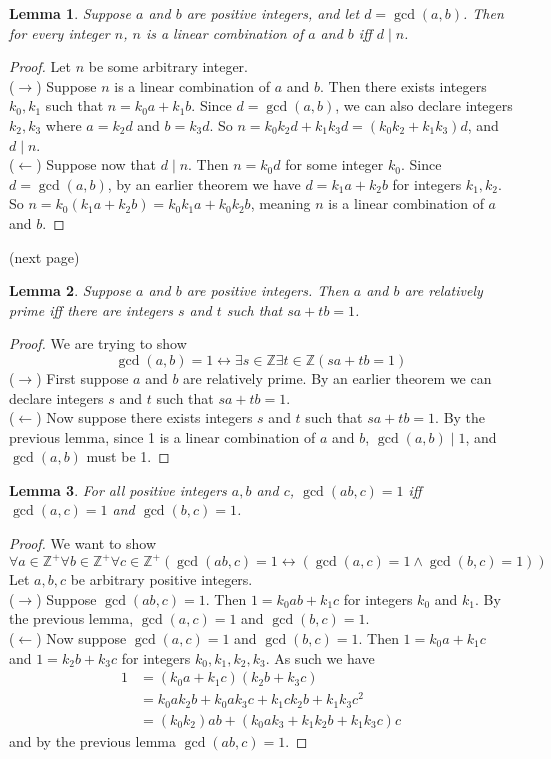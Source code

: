 \documentclass{report}
\newtheorem*{lemma}{Lemma}
\theoremstyle{definition}
\begin{document}
\begin{lemma}
Suppose $a$ and $b$ are positive integers, and let $d=\gcd(a,b)$. Then for every integer $n$, $n$ is a linear combination of $a$ and $b$ iff 
$d\mid n$. 
\end{lemma}
\begin{proof}
Let $n$ be some arbitrary integer.\\
\indent($\rightarrow$) Suppose $n$ is a linear combination of $a$ and $b$. Then there exists integers $k_0,k_1$ such that $n=k_0a+k_1b$. Since
$d=\gcd(a,b)$, we can also declare integers $k_2,k_3$ where $a=k_2d$ and $b=k_3d$. So $n=k_0k_2d+k_1k_3d=(k_0k_2+k_1k_3)d$, and $d\mid n$.\\
\indent ($\leftarrow$) Suppose now that $d\mid n$. Then $n=k_0d$ for some integer $k_0$. Since $d=\gcd(a,b)$, by an 
earlier theorem we have $d=k_1a+k_2b$ for integers $k_1,k_2$. So
$n=k_0(k_1a+k_2b)=k_0k_1a+k_0k_2b$, meaning $n$ is a linear combination
of $a$ and $b$. 
\end{proof}
\noindent(next page)\newpage
\begin{lemma}
Suppose $a$ and $b$ are positive integers. Then $a$ and $b$ are relatively prime iff there are integers $s$ and $t$ such that $sa+tb=1$.
\end{lemma}
\begin{proof}
We are trying to show
\begin{equation*}
\gcd(a,b)=1\leftrightarrow\exists s\in\mathbb Z\exists t\in\mathbb Z(sa+tb=1)
\end{equation*}
\indent($\rightarrow$) First suppose $a$ and $b$ are relatively prime. By an earlier theorem we can declare integers $s$ and $t$ such that 
$sa+tb=1$.\\
\indent($\leftarrow$) Now suppose there exists integers $s$ and $t$ such that $sa+tb=1$. By the previous lemma, since 1 is a linear combination of $a$ and $b$, $\gcd(a,b)\mid 1$, and $\gcd(a,b)$ must be 1.
\end{proof}
\begin{lemma}
For all positive integers $a,b$ and $c$, $\gcd(ab,c)=1$ iff $\gcd(a,c)=1$ and $\gcd(b,c)=1$.
\end{lemma}
\begin{proof}
We want to show
\begin{equation*}
\forall a\in\mathbb Z^+\forall b\in\mathbb Z^+\forall c\in\mathbb Z^+
(\gcd(ab,c)=1\leftrightarrow(\gcd(a,c)=1\land\gcd(b,c)=1))
\end{equation*}
Let $a,b,c$ be arbitrary positive integers.\\
\indent($\rightarrow$) Suppose $\gcd(ab,c)=1$. Then $1=k_0ab+k_1c$ for integers $k_0$ and $k_1$. By the previous lemma, $\gcd(a,c)=1$ and 
$\gcd(b,c)=1$.\\
\indent($\leftarrow$) Now suppose $\gcd(a,c)=1$ and $\gcd(b,c)=1$. Then
$1=k_0a+k_1c$ and $1=k_2b+k_3c$ for integers $k_0,k_1,k_2,k_3$. As such we have
\begin{align*}
1&=(k_0a+k_1c)(k_2b+k_3c)\\
&=k_0ak_2b+k_0ak_3c+k_1ck_2b+k_1k_3c^2\\
&=(k_0k_2)ab+(k_0ak_3+k_1k_2b+k_1k_3c)c
\end{align*}
and by the previous lemma $\gcd(ab,c)=1$.
\end{proof}
\end{document}
